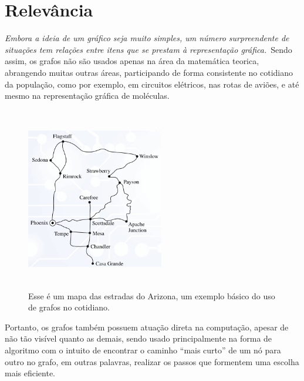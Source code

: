 \documentclass[a4paper, 10pt]{article}
\begin{document}
\section{Relevância}
\quad \textit{Embora a ideia de um gráfico seja muito simples, um número surpreendente de situações tem relações entre itens que se prestam à representação gráfica.}~\cite{J}Sendo assim, os grafos não são usados apenas na área da matemática teorica, abrangendo muitas outras áreas, participando de forma consistente no cotidiano da população, como por exemplo, em circuitos elétricos, nas rotas de aviões, e até mesmo na representação gráfica de moléculas.
\begin{figure}[H]
    \centering
    \includegraphics[width=6cm, height=8cm, angle=0]{Amazonas.png}
    \caption{\label{fig:arizona} Esse é um mapa das estradas do Arizona, um exemplo básico do uso de grafos no cotidiano.}
\end{figure}
\quad Portanto, os grafos também possuem atuação direta na computação, apesar de não tão visível quanto as demais, sendo usado principalmente na forma de algoritmo com o intuito de encontrar o caminho “mais curto” de um nó para outro no grafo, em outras palavras, realizar os passos que formentem uma escolha mais eficiente.
\end{document}
